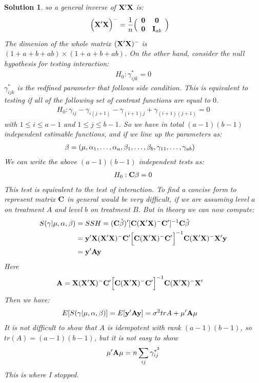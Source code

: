 \documentclass[11pt]{article}
\newtheorem{sol}{Solution}
\begin{document}
\begin{sol}
	so a general inverse of ${\bf X}'{\bf X}$ is:
	\begin{align*}
		\Big({\bf X}'{\bf X}\Big)^{-} &= \frac{1}{n}\Big(\begin{array}{cc} {\bf 0}& {\bf 0}\\ {\bf 0}& {\bf I}_{ab}\end{array}\Big)
	\end{align*}
	The dimenion of the whole matrix $({\bf X}'{\bf X})^{-}$ is $(1 + a + b + ab )\times (1 + a + b + ab)$.\vskip 2mm
	On the other hand, consider the null hypothesis for testing interaction:
	\begin{align*}
		H_0: \gamma_{ijk}^{\ast} = 0
	\end{align*}
	$\gamma_{ijk}^{\ast}$ is the redfined parameter that follows side condition. This is equivalent to testing if all of the following set of contrast functions are equal to $0$.
	\begin{align*}
		H_0: \gamma_{ij} - \gamma_{i(j + 1)} - \gamma_{(i + 1)j} + \gamma_{(i + 1)(j + 1)} = 0
	\end{align*}
	with $1 \leq i \leq a - 1$ and $1 \leq j \leq b-1$. So we have in total  $(a-1)(b-1)$ independent estimable functions, and if we line up the parameters as:
	\begin{align*}
		{\bf \beta} &= (\mu, \alpha_1, \ldots, \alpha_a, \beta_1, \ldots, \beta_b, \gamma_{11}, \ldots, \gamma_{ab})
	\end{align*}
	We can write the above $(a-1)(b-1)$ independent tests as:
	\begin{align*}
		H_0: {\bf C}{\bf \beta} = 0
	\end{align*}
	This test is equivalent to the test of interaction. To find a concise form to represent matrix ${\bf C}$ in general would be very difficult, if we are assuming level $a$ on treatment $A$ and level $b$ on treatment $B$.\vskip 2mm
	But in theory we can now compute:
	\begin{align*}
		S(\gamma|\mu, \alpha, \beta) &= SSH = ({\bf C}\hat{\beta})'[{\bf C}({\bf X}'{\bf X})^-{\bf C}']^{-1}{\bf C}\hat{\beta}\\
		&= {\bf y}'{\bf X}({\bf X}'{\bf X})^-{\bf C}'\Big[{\bf C}({\bf X}'{\bf X})^{-}{\bf C}'\Big]^{-1}{\bf C}({\bf X}'{\bf X})^-{\bf X}'{\bf y}\\
		&= {\bf y}'{\bf A}{\bf y}
	\end{align*}
	Here
	\begin{align*}
		{\bf A} &= {\bf X}({\bf X}'{\bf X})^-{\bf C}'\Big[{\bf C}({\bf X}'{\bf X})^{-}{\bf C}'\Big]^{-1}{\bf C}({\bf X}'{\bf X})^-{\bf X}'
	\end{align*}
	Then we have:
	\begin{align*}
		E[S(\gamma|\mu, \alpha, \beta)] &= E[{\bf y}'{\bf A}{\bf y}] = \sigma^2tr{A}  + {\bf \mu}'{\bf A}{\bf \mu}
	\end{align*}
	It is not difficult to show that $A$ is idempotent with rank $(a - 1)(b - 1)$, so $tr(A)= (a - 1)(b - 1)$, but it is not easy to show
	\begin{align*}
		\mu'{\bf A}\mu = n\sum_{ij}\gamma_{ij}^{\ast^2}
	\end{align*}
	This is where I stopped.
\end{sol}
\end{document}
